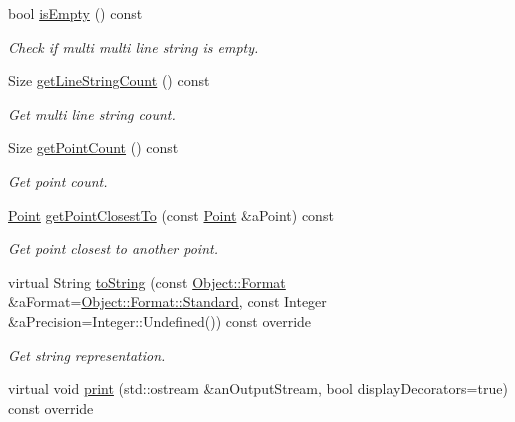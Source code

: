 \begin{DoxyCompactItemize}
bool \hyperlink{classlibrary_1_1math_1_1geom_1_1d2_1_1objects_1_1_multi_line_string_a41b9e07b94cdbe7c2cc9fc49ce8f2d10}{is\+Empty} () const
\begin{DoxyCompactList}\small\item\em Check if multi multi line string is empty. \end{DoxyCompactList}\item 
Size \hyperlink{classlibrary_1_1math_1_1geom_1_1d2_1_1objects_1_1_multi_line_string_a6a4fcd97083f22c5fe163acc0ce23330}{get\+Line\+String\+Count} () const
\begin{DoxyCompactList}\small\item\em Get multi line string count. \end{DoxyCompactList}\item 
Size \hyperlink{classlibrary_1_1math_1_1geom_1_1d2_1_1objects_1_1_multi_line_string_a8d70884126d16f15279c1c16291f5109}{get\+Point\+Count} () const
\begin{DoxyCompactList}\small\item\em Get point count. \end{DoxyCompactList}\item 
\hyperlink{classlibrary_1_1math_1_1geom_1_1d2_1_1objects_1_1_point}{Point} \hyperlink{classlibrary_1_1math_1_1geom_1_1d2_1_1objects_1_1_multi_line_string_ad81881c98cd26ae78544742de4f7be56}{get\+Point\+Closest\+To} (const \hyperlink{classlibrary_1_1math_1_1geom_1_1d2_1_1objects_1_1_point}{Point} \&a\+Point) const
\begin{DoxyCompactList}\small\item\em Get point closest to another point. \end{DoxyCompactList}\item 
virtual String \hyperlink{classlibrary_1_1math_1_1geom_1_1d2_1_1objects_1_1_multi_line_string_a71d1e434196bb8d67054ad28d8aa59a6}{to\+String} (const \hyperlink{classlibrary_1_1math_1_1geom_1_1d2_1_1_object_ac8cd61dada4960cfee9a469231621b17}{Object\+::\+Format} \&a\+Format=\hyperlink{classlibrary_1_1math_1_1geom_1_1d2_1_1_object_ac8cd61dada4960cfee9a469231621b17aeb6d8ae6f20283755b339c0dc273988b}{Object\+::\+Format\+::\+Standard}, const Integer \&a\+Precision=Integer\+::\+Undefined()) const override
\begin{DoxyCompactList}\small\item\em Get string representation. \end{DoxyCompactList}\item 
virtual void \hyperlink{classlibrary_1_1math_1_1geom_1_1d2_1_1objects_1_1_multi_line_string_ab7854c1006501bf5159b890a662198b1}{print} (std\+::ostream \&an\+Output\+Stream, bool display\+Decorators=true) const override

\end{DoxyCompactItemize}
